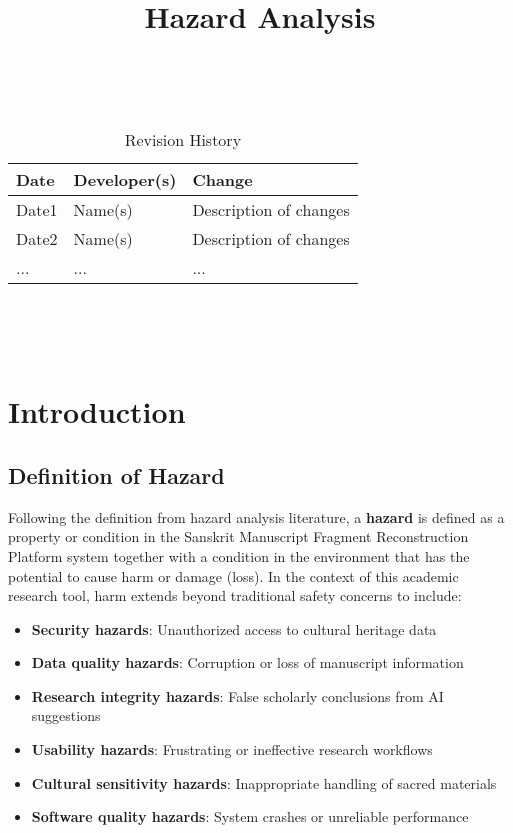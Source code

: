 \documentclass{article}
\title{Hazard Analysis\\\progname}
\author{\authname}
\date{}
\begin{document}
\maketitle
\thispagestyle{empty}

~\newpage


\begin{table}[hp]
\caption{Revision History} \label{TblRevisionHistory}
\begin{tabularx}{\textwidth}{llX}
\toprule
\textbf{Date} & \textbf{Developer(s)} & \textbf{Change}\\
\midrule
Date1 & Name(s) & Description of changes\\
Date2 & Name(s) & Description of changes\\
... & ... & ...\\
\bottomrule
\end{tabularx}
\end{table}

~\newpage

\tableofcontents

~\newpage



\section{Introduction}

\subsection{Definition of Hazard}

Following the definition from hazard analysis literature, a \textbf{hazard} is defined as a property or condition in the Sanskrit Manuscript Fragment Reconstruction Platform system together with a condition in the environment that has the potential to cause harm or damage (loss). In the context of this academic research tool, harm extends beyond traditional safety concerns to include:

\begin{itemize}
\item \textbf{Security hazards}: Unauthorized access to cultural heritage data
\item \textbf{Data quality hazards}: Corruption or loss of manuscript information
\item \textbf{Research integrity hazards}: False scholarly conclusions from AI suggestions
\item \textbf{Usability hazards}: Frustrating or ineffective research workflows
\item \textbf{Cultural sensitivity hazards}: Inappropriate handling of sacred materials
\item \textbf{Software quality hazards}: System crashes or unreliable performance
\end{itemize}
\end{document}
